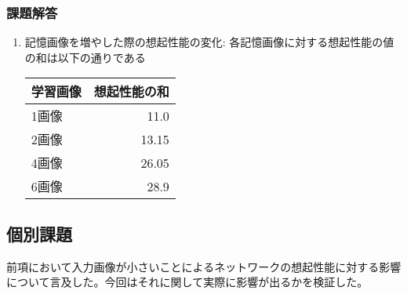 \documentclass{ltjsarticle}
\begin{document}
\subsubsection{課題解答}
\begin{enumerate}
  \item 記憶画像を増やした際の想起性能の変化: 各記憶画像に対する想起性能の値の和は以下の通りである
  \begin{center}
  \begin{tabular}{|l|r|} \hline
    学習画像 & 想起性能の和 \\ \hline
    1画像 & 11.0 \\
    2画像 & 13.15 \\
    4画像 & 26.05 \\
    6画像 & 28.9 \\ \hline
  \end{tabular}
\end{center}
\end{enumerate}
\subsection{個別課題}
前項において入力画像が小さいことによるネットワークの想起性能に対する影響について言及した。今回はそれに関して実際に影響が出るかを検証した。
\end{document}
